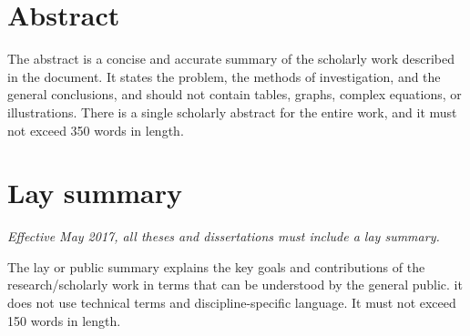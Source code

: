 \section{Abstract}
The abstract is a concise and accurate summary of the scholarly work described in the document. It states the problem, the methods of investigation, and the general conclusions, and should not contain tables, graphs, complex equations, or illustrations. There is a single scholarly abstract for the entire work, and it must not exceed 350 words in length.

\pagebreak
\section{Lay summary}
{\it Effective May 2017, all theses and dissertations must include a lay summary.}

The lay or public summary explains the key goals and contributions of the research/scholarly work in terms that can be understood by the general public. it does not use technical terms and discipline-specific language. It must not exceed 150 words in length.
